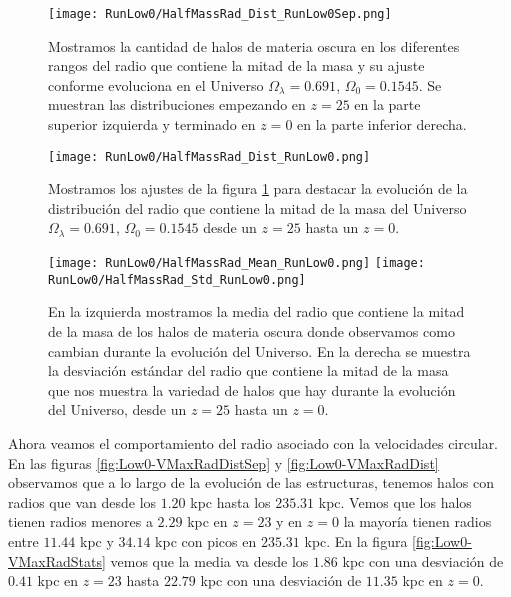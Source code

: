 \begin{figure}[H]
    \centering
    \texttt{[image: RunLow0/HalfMassRad\_Dist\_RunLow0Sep.png]}
    \caption[Radio que contiene la mitad de la masa]{\footnotesize Mostramos la cantidad de halos de materia oscura en los diferentes rangos del radio que contiene la mitad de la masa y su ajuste conforme evoluciona en el Universo $\Omega_\lambda = 0.691$, $\Omega_0 = 0.1545$. Se muestran las distribuciones empezando en $z=25$ en la parte superior izquierda y terminado en $z=0$ en la parte inferior derecha.}
    \label{fig:Low0-HalfMassRadDistSep}
\end{figure}

\begin{figure}[H]
    \centering
    \texttt{[image: RunLow0/HalfMassRad\_Dist\_RunLow0.png]}
    \caption[Distribución del radio que contiene la mitad de la masa]{\footnotesize Mostramos los ajustes de la figura \ref{fig:Low0-HalfMassRadDistSep} para destacar la evolución de la distribución del radio que contiene la mitad de la masa del Universo $\Omega_\lambda = 0.691$, $\Omega_0 = 0.1545$ desde un $z=25$ hasta un $z=0$.}
    \label{fig:Low0-HalfMassRadDist}
\end{figure}

\begin{figure}[H]
    \centering
    \texttt{[image: RunLow0/HalfMassRad\_Mean\_RunLow0.png]}
    \texttt{[image: RunLow0/HalfMassRad\_Std\_RunLow0.png]}
    \caption[Media y desviación estándar del radio de la mitad de la masa]{\footnotesize En la izquierda mostramos la media del radio que contiene la mitad de la masa de los halos de materia oscura donde observamos como cambian durante la evolución del Universo. En la derecha se muestra la desviación estándar del radio que contiene la mitad de la masa que nos muestra la variedad de halos que hay durante la evolución del Universo, desde un $z=25$ hasta un $z=0$.}
    \label{fig:Low0-HalfMassRadStats}
\end{figure}

Ahora veamos el comportamiento del radio asociado con la velocidades circular. En las figuras \ref{fig:Low0-VMaxRadDistSep} y \ref{fig:Low0-VMaxRadDist} observamos que a lo largo de la evolución de las estructuras, tenemos halos con radios que van desde los $1.20$ kpc hasta los $235.31$ kpc. Vemos que los halos tienen radios menores a $2.29$ kpc en $z=23$ y en $z=0$ la mayoría tienen radios entre $11.44$ kpc y $34.14$ kpc con picos en $235.31$ kpc. En la figura \ref{fig:Low0-VMaxRadStats} vemos que la media va desde los $1.86$ kpc con una desviación de $0.41$ kpc en $z=23$ hasta $22.79$ kpc con una desviación de $11.35$ kpc en $z=0$.

